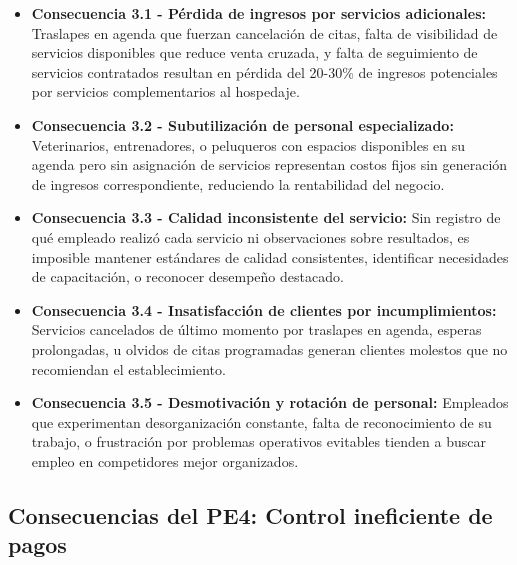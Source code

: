 	\begin{itemize}
		\item \textbf{Consecuencia 3.1 - Pérdida de ingresos por servicios adicionales:} Traslapes en agenda que fuerzan cancelación de citas, falta de visibilidad de servicios disponibles que reduce venta cruzada, y falta de seguimiento de servicios contratados resultan en pérdida del 20-30\% de ingresos potenciales por servicios complementarios al hospedaje.
		
		\item \textbf{Consecuencia 3.2 - Subutilización de personal especializado:} Veterinarios, entrenadores, o peluqueros con espacios disponibles en su agenda pero sin asignación de servicios representan costos fijos sin generación de ingresos correspondiente, reduciendo la rentabilidad del negocio.
		
		\item \textbf{Consecuencia 3.3 - Calidad inconsistente del servicio:} Sin registro de qué empleado realizó cada servicio ni observaciones sobre resultados, es imposible mantener estándares de calidad consistentes, identificar necesidades de capacitación, o reconocer desempeño destacado.
		
		\item \textbf{Consecuencia 3.4 - Insatisfacción de clientes por incumplimientos:} Servicios cancelados de último momento por traslapes en agenda, esperas prolongadas, u olvidos de citas programadas generan clientes molestos que no recomiendan el establecimiento.
		
		\item \textbf{Consecuencia 3.5 - Desmotivación y rotación de personal:} Empleados que experimentan desorganización constante, falta de reconocimiento de su trabajo, o frustración por problemas operativos evitables tienden a buscar empleo en competidores mejor organizados.
	\end{itemize}

\subsection{Consecuencias del PE4: Control ineficiente de pagos}
\label{sec:consecuencias4}


